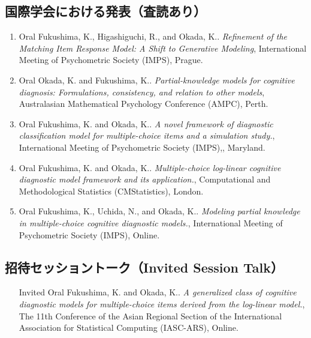 \subsection*{国際学会における発表（査読あり）}
\begin{enumerate}
\item  Oral Fukushima, K., Higashiguchi, R., and Okada, K.. \textit{Refinement of the Matching Item Response Model: A Shift to Generative Modeling}, International Meeting of Psychometric Society (IMPS), Prague.
\item  Oral Okada, K. and Fukushima, K.. \textit{Partial-knowledge models for cognitive diagnosis: Formulations, consistency, and relation to other models}, Australasian Mathematical Psychology Conference (AMPC), Perth.
\item  Oral Fukushima, K. and Okada, K.. \textit{A novel framework of diagnostic classification model for multiple-choice items and a simulation study.}, International Meeting of Psychometric Society (IMPS),, Maryland.
\item  Oral Fukushima, K. and Okada, K.. \textit{Multiple-choice log-linear cognitive diagnostic model framework and its application.}, Computational and Methodological Statistics (CMStatistics), London.
\item  Oral Fukushima, K., Uchida, N., and Okada, K.. \textit{Modeling partial knowledge in multiple-choice cognitive diagnostic models.}, International Meeting of Psychometric Society (IMPS), Online.
\end{enumerate}

\subsection*{招待セッショントーク（Invited Session Talk）}
\begin{enumerate}
\item [Invited] Oral Fukushima, K. and Okada, K.. \textit{A generalized class of cognitive diagnostic models for multiple-choice items derived from the log-linear model.}, The 11th Conference of the Asian Regional Section of the International Association for Statistical Computing (IASC-ARS), Online.
\end{enumerate}

